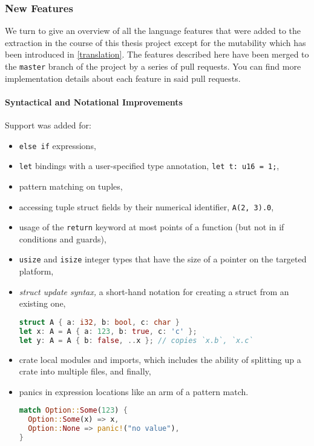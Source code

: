 \subsubsection{New Features}

We turn to give an overview of all the language features that were added
to the extraction in the course of this thesis project except for the
mutability which has been introduced in \autoref{translation}. The
features described here have been merged to the
\passthrough{\lstinline!master!} branch of the project by a series of
pull requests. You can find more implementation details about each
feature in said pull requests.

\paragraph{Syntactical and Notational Improvements}

Support was added for:

\begin{itemize}
\item
  \passthrough{\lstinline!else if!} expressions,
\item
  \passthrough{\lstinline!let!} bindings with a user-specified type
  annotation, \passthrough{\lstinline!let t: u16 = 1;!},
\item
  pattern matching on tuples,
\item
  accessing tuple struct fields by their numerical identifier,
  \passthrough{\lstinline!A(2, 3).0!},
\item
  usage of the \passthrough{\lstinline!return!} keyword at most points
  of a function (but not in if conditions and guards),
\item
  \passthrough{\lstinline!usize!} and \passthrough{\lstinline!isize!}
  integer types that have the size of a pointer on the targeted
  platform,
\item
  \emph{struct update syntax,} a short-hand notation for creating a
  struct from an existing one,

\begin{lstlisting}[language=Rust]
struct A { a: i32, b: bool, c: char }
let x: A = A { a: 123, b: true, c: 'c' };
let y: A = A { b: false, ..x }; // copies `x.b`, `x.c`
\end{lstlisting}
\item
  crate local modules and imports, which includes the ability of
  splitting up a crate into multiple files, and finally,
\item
  panics in expression locations like an arm of a pattern match.

\begin{lstlisting}[language=Rust]
match Option::Some(123) {
  Option::Some(x) => x,
  Option::None => panic!("no value"),
}
\end{lstlisting}
\end{itemize}

